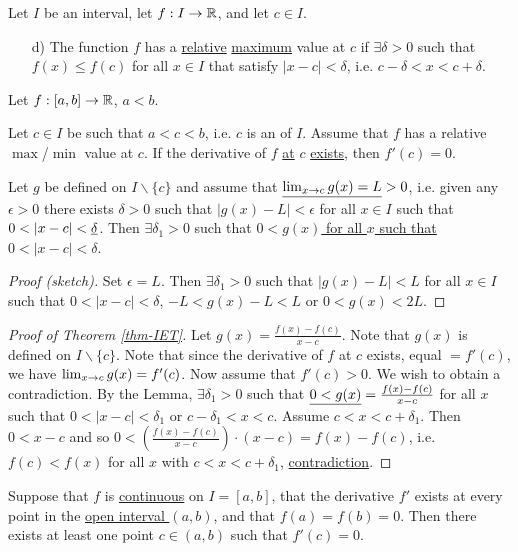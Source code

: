 \documentclass[]{article}
\begin{document}
\begin{definition}
	Let $I$ be an interval, let $f:I\rightarrow\mathbb{R}$, and let $c\in I$. 
	\begin{enumerate}
		\item[d)] The function $f$ has a \ul{relative} \ul{maximum} value  at $c$ if $\exists \delta>0$ such that $f(x)\leq f(c)$ for all $x\in I$ that satisfy \ul{$|x-c|<\delta$}, i.e. $c-\delta<x<c+\delta$.
	\end{enumerate}
\end{definition}
Let $f:[a,b] \rightarrow\mathbb{R}$, $a<b$.
\begin{theorem}
	 Let $c\in I$ be such that $a<c<b$, i.e. $c$ is an  of $I$. Assume that $f$ has a relative $\max$/$\min$ value at $c$. If the derivative of $f$ \ul{at} \ul{$c$} \ul{exists}, then $f'(c) = 0$.
	\label{thm-IET}
\end{theorem}
\begin{lemma}
	Let $g$ be defined on $I\backslash\{c\}$ and assume that $\underline{\lim_{x\rightarrow c} g(x) = L} >0$, i.e. given any $\epsilon>0$ there exists $\delta>0$ such that $|g(x)-L|<\epsilon$ for all $x\in I$ such that $0<|x-c|< \ul{\delta}$. Then $\exists\delta_1 >0$ such that \ul{$0<g(x)$ for all $x$ such that $0<|x-c|<\delta$}.
\end{lemma}
\begin{proof}
	[Proof (sketch)] Set $\epsilon = L$. Then $\exists \delta_1 > 0$ such that $|g(x)-L|<L$ for all $x\in I$ such that $0<|x-c|<\delta$, $-L<g(x)-L<L$ or $0<g(x)<2L$.
\end{proof}
\begin{proof}
	[Proof of Theorem \ref{thm-IET}] Let $g(x) = \frac{f(x)-f(c)}{x-c}$. Note that $g(x)$ is defined on \ul{$I\backslash\{c\}$}. Note that since the derivative of $f$ at $c$ exists, equal $ = f'(c)$, we have \ul{$\lim_{x\rightarrow c} g(x) = f'(c)$}. Now assume that \ul{$f'(c) > 0$}. We wish to obtain a contradiction. By the Lemma, $\exists \delta_1 > 0$ such that $\underline{0 < g(x)}=\frac{f(x)-f(c)}{x-c}$ for all $x$ such that $0<|x-c|<\delta_1$ or $c-\delta_1<x<c$. %
	Assume \ul{$c<x<c+\delta_1$}. Then $0<x-c$ and so $0 < \left( \frac{f(x)-f(c)}{x-c} \right) \cdot (x-c) = f(x) - f(c)$, i.e. $f(c)<f(x)$ for all $x$ with $c<x<c+\delta_1$, \ul{contradiction}.
\end{proof}
\begin{theorem}
	 Suppose that $f$ is \ul{continuous} on \ul{$I=[a,b]$}, that the derivative $f'$ exists at every point in the \ul{open interval $(a,b)$}, and that $f(a) = f(b) = 0$. Then there exists at least one point $c\in(a,b)$ such that $f'(c) = 0$.
\end{theorem}
\end{document}
